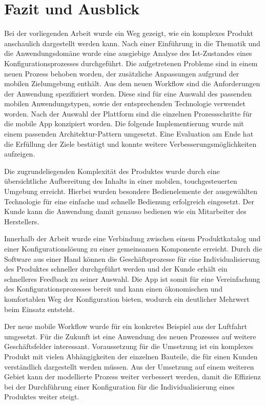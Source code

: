 \chapter{Fazit und Ausblick}\label{chapter_7}
Bei der vorliegenden Arbeit wurde ein Weg gezeigt, wie ein komplexes Produkt anschaulich dargestellt werden kann. Nach einer Einführung in die Thematik und die Anwendungsdomäne wurde eine ausgiebige Analyse des Ist-Zustandes eines Konfigurationsprozesses durchgeführt. Die aufgetretenen Probleme sind in einem neuen Prozess behoben worden, der zusätzliche Anpassungen aufgrund der mobilen Zielumgebung enthält. Aus dem neuen Workflow sind die Anforderungen der Anwendung spezifiziert worden. Diese sind für eine Auswahl des passenden mobilen Anwendungstypen, sowie der entsprechenden Technologie verwendet worden. Nach der Auswahl der Plattform sind die einzelnen Prozessschritte für die mobile App konzipiert worden. Die folgende Implementierung wurde mit einem passenden Architektur-Pattern umgesetzt. Eine Evaluation am Ende hat die Erfüllung der Ziele bestätigt und konnte weitere Verbesserungsmöglichkeiten aufzeigen.

Die zugrundeliegenden Komplexität des Produktes wurde durch eine übersichtliche Aufbereitung des Inhalts in einer mobilen, touchgesteuerten Umgebung erreicht. Hierbei wurden besondere Bedienelemente der ausgewählten Technologie für eine einfache und schnelle Bedienung erfolgreich eingesetzt. Der Kunde kann die Anwendung damit genauso bedienen wie ein Mitarbeiter des Herstellers. 

Innerhalb der Arbeit wurde eine Verbindung zwischen einem Produktkatalog und einer Konfigurationslösung zu einer gemeinsamen Komponente erreicht.  Durch die Software aus einer Hand können die Geschäftsprozesse für eine Individualisierung des Produktes schneller durchgeführt werden und der Kunde erhält ein schnelleres Feedback zu seiner Auswahl. Die App ist somit für eine Vereinfachung des Konfigurationsprozesses bereit und kann einen ökonomischen und komfortablen Weg der Konfiguration bieten, wodurch ein deutlicher Mehrwert beim Einsatz entsteht.  \par 

Der neue mobile Workflow wurde für ein konkretes Beispiel aus der Luftfahrt umgesetzt. Für die Zukunft ist eine Anwendung des neuen Prozesses auf weitere Geschäftsfelder interessant. Voraussetzung für die Umsetzung ist ein komplexes Produkt mit vielen Abhängigkeiten der einzelnen Bauteile, die für einen Kunden verständlich dargestellt werden müssen. Aus der Umsetzung auf einem weiteren Gebiet kann der modellierte Prozess weiter verbessert werden, damit die Effizienz bei der Durchführung einer Konfiguration für die Individualisierung eines Produktes weiter steigt.